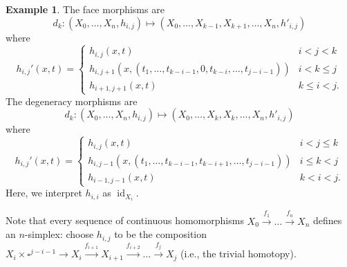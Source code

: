 \documentclass[a4paper]{amsart}
\numberwithin{figure}{section}
\theoremstyle{theorem}
\theoremstyle{definition}
\newtheorem{exam}[thm]{Example}
\newcommand{\Top}{{Top}}
\DeclareMathOperator{\id}{id}
\begin{document}
\begin{exam}
The face morphisms are
\[ d_k: (X_0, \dots, X_n, h_{i,j}) \mapsto (X_0, \dots, X_{k-1}, X_{k+1}, \dots, X_n, h'_{i,j}) \]
where 
\[ h_{i,j}'(x,t) = 
\left \{ \begin{array}{cc}
h_{i,j}(x,t) & i < j < k \\
h_{i,j{+}1}(x, (t_1, \dots, t_{k{-}i{-}1}, 0, t_{k{-}i}, \dots, t_{j{-}i{-}1})) & i < k \leq j \\
h_{i{+}1,j{+}1}(x,t) & k \leq i < j.
\end{array} \right .\]
The degeneracy morphisms are 
\[ d_k: (X_0, \dots, X_n, h_{i,j}) \mapsto (X_0, \dots, X_{k}, X_{k}, \dots, X_n, h'_{i,j}) \]
where 
\[ h_{i,j}'(x,t) = 
\left \{ \begin{array}{cc}
h_{i,j}(x,t) & i < j \leq k \\
h_{i,j{-}1}(x, (t_1, \dots, t_{k{-}i{-}1}, t_{k{-}i{+}1}, \dots, t_{j{-}i{-}1})) & i \leq k < j \\
h_{i{-}1,j{-}1}(x,t) & k < i < j.
\end{array} \right .\]
Here, we interpret $h_{i,i}$ as $\id_{X_i}$. 

Note that every sequence of continuous homomorphisms $X_0 \stackrel{f_1}{\to} \dots \stackrel{f_n}{\to} X_n$ defines an $n$-simplex: choose $h_{i,j}$ to be the composition $X_i {\times} \square^{j{-}i{-}1} \to X_i \stackrel{f_{i{+}1}}{\to} X_{i {+} 1} \stackrel{f_{i{+}2}}{\to} \dots \stackrel{f_{j}}{\to} X_{j}$ (i.e., the trivial homotopy).
\end{exam}
\end{document}
